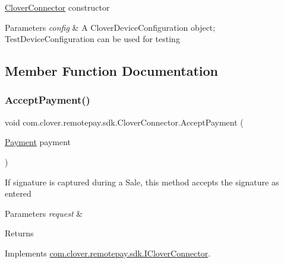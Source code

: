 \hyperlink{classcom_1_1clover_1_1remotepay_1_1sdk_1_1_clover_connector}{Clover\+Connector} constructor 


\begin{DoxyParams}{Parameters}
{\em config} & A Clover\+Device\+Configuration object; Test\+Device\+Configuration can be used for testing \\
\hline
\end{DoxyParams}


\subsection{Member Function Documentation}
\mbox{\label{classcom_1_1clover_1_1remotepay_1_1sdk_1_1_clover_connector_afe33a1ba414608b2b05a3336128c7b5c}} 
\subsubsection{\texorpdfstring{Accept\+Payment()}{AcceptPayment()}}
{\footnotesize\ttfamily void com.\+clover.\+remotepay.\+sdk.\+Clover\+Connector.\+Accept\+Payment (\begin{DoxyParamCaption}\item[{\hyperlink{classcom_1_1clover_1_1sdk_1_1v3_1_1payments_1_1_payment}{Payment}}]{payment }\end{DoxyParamCaption})}



If signature is captured during a Sale, this method accepts the signature as entered 


\begin{DoxyParams}{Parameters}
{\em request} & \\
\hline
\end{DoxyParams}
\begin{DoxyReturn}{Returns}

\end{DoxyReturn}


Implements \hyperlink{interfacecom_1_1clover_1_1remotepay_1_1sdk_1_1_i_clover_connector_ad6286e6d5ec3157f3ceeafc1de504dff}{com.\+clover.\+remotepay.\+sdk.\+I\+Clover\+Connector}.

